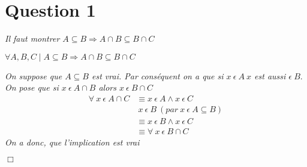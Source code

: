 \section*{Question 1}
\noindent
\emph{Il faut montrer $ A \subseteq B \Rightarrow A \cap B \subseteq B \cap C$}
\bigskip

\centerline{$\forall A,B,C \mid A \subseteq B \Rightarrow A \cap B \subseteq B \cap C$}
\bigskip
\noindent
\emph{On suppose que $A \subseteq B$ est vrai. Par conséquent on a que si $x\ \epsilon\ A\ x$ est aussi $\epsilon\ B.$\\
	On pose que si $x\ \epsilon\ A \cap B$ alors $x\ \epsilon\ B \cap C$}
\begin{align*}
	\forall\ x\ \epsilon\ A \cap C &\equiv x\ \epsilon\ A \wedge x\ \epsilon\ C\\
	&\ x\ \epsilon\ B\ (par\ x\ \epsilon\ A \subseteq B)\\
	&\equiv x\ \epsilon\ B \wedge x\ \epsilon\ C\\
	&\equiv \forall\ x\ \epsilon\ B \cap C
\end{align*}
\smallskip
\noindent
\emph{On a donc, que l'implication est vrai}
\begin{flushright}
	$\Box$
\end{flushright}
